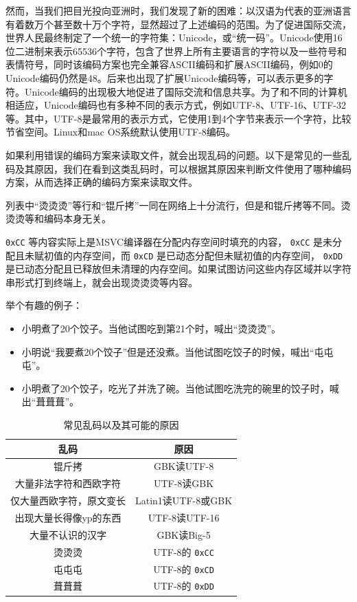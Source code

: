 然而，当我们把目光投向亚洲时，我们发现了新的困难：以汉语为代表的亚洲语言有着数万个甚至数十万个字符，显然超过了上述编码的范围。为了促进国际交流，世界人民最终制定了一个统一的字符集：Unicode，或“统一码”。Unicode使用16位二进制来表示65536个字符，包含了世界上所有主要语言的字符以及一些符号和表情符号，同时该编码方案也完全兼容ASCII编码和扩展ASCII编码，例如0的Unicode编码仍然是48。后来也出现了扩展Unicode编码等，可以表示更多的字符。Unicode编码的出现极大地促进了国际交流和信息共享。为了和不同的计算机相适应，Unicode编码也有多种不同的表示方式，例如UTF-8、UTF-16、UTF-32等。其中，UTF-8是最常用的表示方式，它使用1到4个字节来表示一个字符，比较节省空间。Linux和mac OS系统默认使用UTF-8编码。

如果利用错误的编码方案来读取文件，就会出现乱码的问题。以下是常见的一些乱码及其原因，我们在看到这类乱码时，可以根据其原因来判断文件使用了哪种编码方案，从而选择正确的编码方案来读取文件。

\begin{note}
  列表中“烫烫烫”等行和“锟斤拷”一同在网络上十分流行，但是和锟斤拷等不同。烫烫烫等和编码本身无关。
  
   \texttt{0xCC} 等内容实际上是MSVC编译器在分配内存空间时填充的内容， \texttt{0xCC} 是未分配且未赋初值的内存空间，而 \texttt{0xCD} 是已动态分配但未赋初值的内存空间， \texttt{0xDD} 是已动态分配且已释放但未清理的内存空间。如果试图访问这些内存区域并以字符串形式打到终端上，就会出现烫烫烫等内容。

  举个有趣的例子：
  \begin{itemize}
    \item 小明煮了20个饺子。当他试图吃到第21个时，喊出“烫烫烫”。
    \item 小明说“我要煮20个饺子”但是还没煮。当他试图吃饺子的时候，喊出“屯屯屯”。
    \item 小明煮了20个饺子，吃光了并洗了碗。当他试图吃洗完的碗里的饺子时，喊出“葺葺葺”。
  \end{itemize}
\end{note}

\begin{table}[ht]
  \centering
  \caption{常见乱码以及其可能的原因}
  \begin{tabular}{c|c}
    \toprule
    乱码 & 原因 \\
    \midrule
    锟斤拷 & GBK读UTF-8 \\
    大量非法字符和西欧字符 & UTF-8读GBK \\
    仅大量西欧字符，原文变长 & Latin1读UTF-8或GBK \\
    出现大量长得像yp的东西 & UTF-8读UTF-16 \\
    大量不认识的汉字 & GBK读Big-5 \\
    \midrule
    烫烫烫 & UTF-8的 \texttt{0xCC} \\
    屯屯屯 & UTF-8的 \texttt{0xCD} \\
    葺葺葺 & UTF-8的 \texttt{0xDD} \\
    \bottomrule
  \end{tabular}
\end{table}

